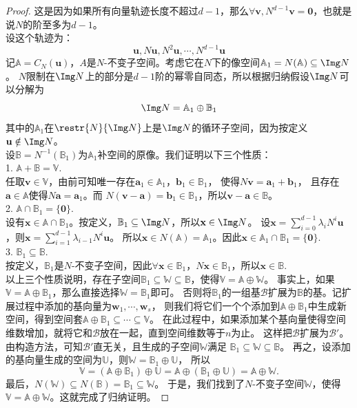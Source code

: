 \documentclass[12pt,UTF8,fontset=none]{ctexbook}
\begin{document}
\begin{appendix}
\begin{proof}
这是因为如果所有向量轨迹长度不超过$d-1$，那么$\forall \mathbf{v}, N^{d-1}\mathbf{v} = \mathbf{0}$，也就是说$N$的阶至多为$d-1$。\\
设这个轨迹为：
$$ \mathbf{u}, N\mathbf{u}, N^2 \mathbf{u}, \cdots , N^{d - 1} \mathbf{u}$$
记$\mathbb{A} = C_N(\mathbf{u})$，$A$是$N$-不变子空间。考虑它在$N$下的像空间$\mathbb{A}_1 = N(\mathbb{A}) \subseteq \Img N$。
$N$限制在$\Img N$上的部分是$d-1$阶的幂零自同态，所以根据归纳假设$\Img N$可以分解为
$$ \Img N = \mathbb{A}_1 \oplus \mathbb{B}_1 $$
其中的$\mathbb{A}_1$在$\restr{N}{\Img N}$上是$\Img N$的循环子空间，因为按定义$\mathbf{u}\notin \Img N$。\\
设$\mathbb{B} = N^{-1}(\mathbb{B}_1)$为$\mathbb{A}_1$补空间的原像。我们证明以下三个性质：\\
1. $\mathbb{A} + \mathbb{B} = \mathbb{V}.$\\
任取$\mathbf{v} \in \mathbb{V}$，由前可知唯一存在$\mathbf{a}_1\in\mathbb{A}_1$，$\mathbf{b}_1\in\mathbb{B}_1$，
使得$N\mathbf{v} = \mathbf{a}_1 + \mathbf{b}_1$，
且存在$\mathbf{a}\in\mathbb{A}$使得$N\mathbf{a} = \mathbf{a}_1$。而
$N(\mathbf{v} - \mathbf{a}) = \mathbf{b}_1\in\mathbb{B}_1$，所以$\mathbf{v} - \mathbf{a} \in \mathbb{B}$。\\
2. $\mathbb{A} \cap \mathbb{B}_1 = \{\mathbf{0}\}.$\\
设有$\mathbf{x} \in \mathbb{A} \cap \mathbb{B}_1$。按定义，$\mathbb{B}_1 \subseteq \Img N$，所以$\mathbf{x} \in \Img N$。
设$\mathbf{x} = \sum_{i=0}^{d-1} \lambda_i N^i\mathbf{u}$，则$\mathbf{x} = \sum_{i=1}^{d-1} \lambda_{i-1} N^i\mathbf{u}$。
所以$\mathbf{x} \in N(\mathbb{A}) = \mathbb{A}_1$。因此$\mathbf{x} \in \mathbb{A}_1 \cap \mathbb{B}_1 = \{\mathbf{0}\}.$\\
3. $\mathbb{B}_1 \subseteq \mathbb{B}.$\\
按定义，$\mathbb{B}_1$是$N$-不变子空间，因此$\forall \mathbf{x}\in\mathbb{B}_1$，$N\mathbf{x} \in \mathbb{B}_1$，所以$\mathbf{x}\in\mathbb{B}.$\\
以上三个性质说明，存在子空间$\mathbb{B}_1 \subseteq \mathbb{W} \subseteq \mathbb{B}$，使得$\mathbb{V} = \mathbb{A} \oplus \mathbb{W}$。
事实上，如果$\mathbb{V} = \mathbb{A}\oplus\mathbb{B}_1$，那么直接选择$\mathbb{W} = \mathbb{B}_1$即可。
否则将$\mathbb{B}_1$的一组基$\mathcal{B}$扩展为$\mathbb{B}$的基。记扩展过程中添加的基向量为$\mathbf{w}_1, \cdots, \mathbf{w}_s$，
则我们将它们一个个添加到$\mathbb{A}\oplus\mathbb{B}_1$中生成新空间，得到空间套$\mathbb{A}\oplus\mathbb{B}_1 \subseteq \cdots \subseteq \mathbb{V}$。
在此过程中，如果添加某个基向量使得空间维数增加，就将它和$\mathcal{B}$放在一起，直到空间维数等于$n$为止。
这样把$\mathcal{B}$扩展为$\mathcal{B}'$。由构造方法，可知$\mathcal{B}'$直无关，且生成的子空间$\mathbb{W}$满足
$\mathbb{B}_1 \subseteq \mathbb{W} \subseteq \mathbb{B}$。
再之，设添加的基向量生成的空间为$\mathbb{U}$，则$\mathbb{W} = \mathbb{B}_1 \oplus \mathbb{U}$，
所以
$$\mathbb{V} = (\mathbb{A}\oplus\mathbb{B}_1)\oplus \mathbb{U} = \mathbb{A}\oplus(\mathbb{B}_1\oplus \mathbb{U}) = \mathbb{A} \oplus \mathbb{W}.$$
最后，$N(\mathbb{W}) \subseteq N(\mathbb{B}) = \mathbb{B}_1 \subseteq \mathbb{W}$。
于是，我们找到了$N$-不变子空间$\mathbb{W}$，使得$\mathbb{V} = \mathbb{A} \oplus \mathbb{W}$。这就完成了归纳证明。


\end{proof}
\end{appendix}
\end{document}
